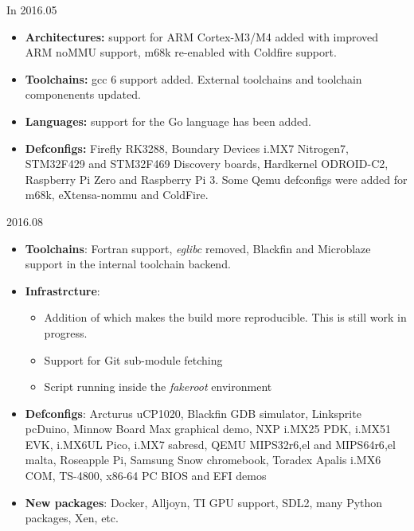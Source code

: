 \begin{frame}{In 2016.05}
  \begin{itemize}
  \item {\bf Architectures:} support for ARM Cortex-M3/M4 added with
    improved ARM noMMU support, m68k re-enabled with Coldfire support.
  \item {\bf Toolchains:} gcc 6 support added. External toolchains and
    toolchain componenents updated.
  \item {\bf Languages:} support for the Go language has been added.
  \item {\bf Defconfigs:} Firefly RK3288, Boundary Devices i.MX7
    Nitrogen7, STM32F429 and STM32F469 Discovery boards, Hardkernel
    ODROID-C2, Raspberry Pi Zero and Raspberry Pi 3. Some Qemu
    defconfigs were added for m68k, eXtensa-nommu and ColdFire.
  \end{itemize}
\end{frame}

\begin{frame}{2016.08}
  \begin{itemize}
  \item {\bf Toolchains}: Fortran support, {\em eglibc} removed,
    Blackfin and Microblaze support in the internal toolchain backend.
  \item {\bf Infrastrcture}:
    \begin{itemize}
    \item Addition of  which makes the build more
      reproducible. This is still work in progress.
    \item Support for Git sub-module fetching
    \item Script running inside the {\em fakeroot} environment
    \end{itemize}
  \item {\bf Defconfigs}: Arcturus uCP1020, Blackfin GDB simulator,
    Linksprite pcDuino, Minnow Board Max graphical demo, NXP i.MX25
    PDK, i.MX51 EVK, i.MX6UL Pico, i.MX7 sabresd, QEMU MIPS32r6{,el}
    and MIPS64r6{,el} malta, Roseapple Pi, Samsung Snow chromebook,
    Toradex Apalis i.MX6 COM, TS-4800, x86-64 PC BIOS and EFI demos
  \item {\bf New packages}: Docker, Alljoyn, TI GPU support, SDL2,
    many Python packages, Xen, etc.
  \end{itemize}
\end{frame}

